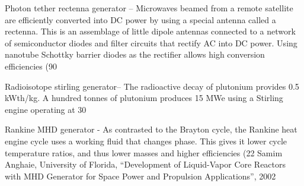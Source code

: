 \documentclass[a4paper]{book}
\begin{document}
Photon tether rectenna generator – Microwaves beamed from a remote satellite are efficiently converted into DC power by using a special antenna called a rectenna.  This is an assemblage of little dipole antennas connected to a network of semiconductor diodes and filter circuits that rectify AC into DC power. Using nanotube Schottky barrier diodes as the rectifier allows high conversion efficiencies (90%

Radioisotope stirling generator– The radioactive decay of plutonium provides 0.5 kWth/kg. A hundred tonnes of plutonium produces 15 MWe using a Stirling engine operating at 30%
 
Rankine MHD generator - As contrasted to the Brayton cycle, the Rankine heat engine cycle uses a working fluid that changes phase. This gives it lower cycle temperature ratios, and thus lower masses and higher efficiencies (22%
Samim Anghaie, University of Florida, “Development of Liquid-Vapor Core Reactors with MHD Generator for Space Power and Propulsion Applications”, 2002
 
\end{document}
